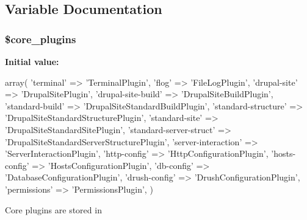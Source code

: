 \subsection{Variable Documentation}
\hypertarget{common_8php_a9efe6b2fd5e0e018e9883090f254b25c}{
\subsubsection[{\$core\-\_\-plugins}]{\setlength{\rightskip}{0pt plus 5cm}\$core\-\_\-plugins}}\label{common_8php_a9efe6b2fd5e0e018e9883090f254b25c}
{\bfseries Initial value\-:}
\begin{DoxyCode}
 array(
  \textcolor{stringliteral}{'terminal'} => \textcolor{stringliteral}{'TerminalPlugin'},
  \textcolor{stringliteral}{'flog'} => \textcolor{stringliteral}{'FileLogPlugin'},
  \textcolor{stringliteral}{'drupal-site'} => \textcolor{stringliteral}{'DrupalSitePlugin'},
  \textcolor{stringliteral}{'drupal-site-build'} => \textcolor{stringliteral}{'DrupalSiteBuildPlugin'},
  \textcolor{stringliteral}{'standard-build'} => \textcolor{stringliteral}{'DrupalSiteStandardBuildPlugin'},
  \textcolor{stringliteral}{'standard-structure'} => \textcolor{stringliteral}{'DrupalSiteStandardStructurePlugin'},
  \textcolor{stringliteral}{'standard-site'} => \textcolor{stringliteral}{'DrupalSiteStandardSitePlugin'},
  \textcolor{stringliteral}{'standard-server-struct'} => \textcolor{stringliteral}{'DrupalSiteStandardServerStructurePlugin'},
  \textcolor{stringliteral}{'server-interaction'} => \textcolor{stringliteral}{'ServerInteractionPlugin'},
  \textcolor{stringliteral}{'http-config'} => \textcolor{stringliteral}{'HttpConfigurationPlugin'},
  \textcolor{stringliteral}{'hosts-config'} => \textcolor{stringliteral}{'HostsConfigurationPlugin'},
  \textcolor{stringliteral}{'db-config'} => \textcolor{stringliteral}{'DatabaseConfigurationPlugin'},
  \textcolor{stringliteral}{'drush-config'} => \textcolor{stringliteral}{'DrushConfigurationPlugin'},
  \textcolor{stringliteral}{'permissions'} => \textcolor{stringliteral}{'PermissionsPlugin'},
)
\end{DoxyCode}
Core plugins are stored in

